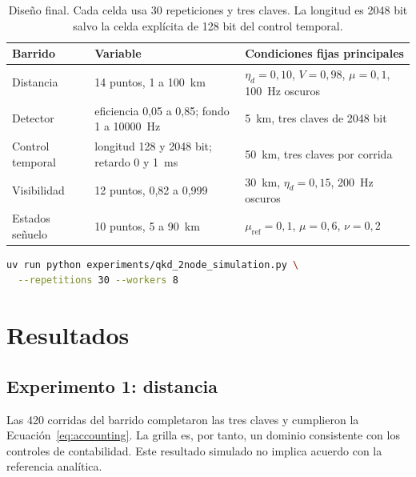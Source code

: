 \documentclass[12pt,a4paper]{article}
\begin{document}
\begin{table}[htbp]
  \centering
  \small
  \begin{tabularx}{\textwidth}{lYY}
    \toprule
    Barrido & Variable & Condiciones fijas principales \\
    \midrule
    Distancia & 14 puntos, 1 a \SI{100}{\kilo\meter} &
      \(\eta_d=0{,}10\), \(V=0{,}98\), \(\mu=0{,}1\), \SI{100}{\hertz} oscuros \\
    Detector & eficiencia 0,05 a 0,85; fondo 1 a \SI{10000}{\hertz} &
      \SI{5}{\kilo\meter}, tres claves de 2048 bit \\
    Control temporal & longitud 128 y 2048 bit; retardo 0 y \SI{1}{\milli\second} &
      \SI{50}{\kilo\meter}, tres claves por corrida \\
    Visibilidad & 12 puntos, 0,82 a 0,999 &
      \SI{30}{\kilo\meter}, \(\eta_d=0{,}15\), \SI{200}{\hertz} oscuros \\
    Estados señuelo & 10 puntos, 5 a \SI{90}{\kilo\meter} &
      \(\mu_{\mathrm{ref}}=0{,}1\), \(\mu=0{,}6\), \(\nu=0{,}2\) \\
    \bottomrule
  \end{tabularx}
  \caption{Diseño final. Cada celda usa 30 repeticiones y tres claves. La
  longitud es 2048 bit salvo la celda explícita de 128 bit del control temporal.}
  \label{tab:design}
\end{table}

\begin{lstlisting}[language=bash,caption={Comando registrado para reproducir datos, figuras y macros.}]
uv run python experiments/qkd_2node_simulation.py \
  --repetitions 30 --workers 8
\end{lstlisting}

\section{Resultados}

\subsection*{Experimento 1: distancia}

Las 420 corridas del barrido completaron las tres claves y cumplieron la
Ecuación~\ref{eq:accounting}. La grilla es, por tanto, un dominio consistente
con los controles de contabilidad. Este resultado simulado no implica acuerdo
con la referencia analítica.
\end{document}
